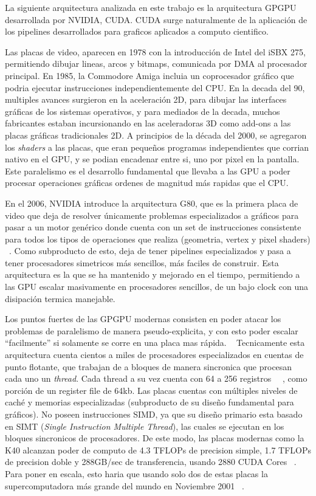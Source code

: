 La siguiente arquitectura analizada en este trabajo es la arquitectura GPGPU desarrollada por NVIDIA, CUDA.
CUDA surge naturalmente de la aplicaci\'on de los pipelines desarrollados para
graficos aplicados a computo cientifico.

Las placas de video, aparecen en 1978 con la introducci\'on de Intel del iSBX 275, permitiendo dibujar lineas,
arcos y bitmaps, comunicada por DMA al procesador principal. En 1985, la Commodore Amiga incluia un coprocesador
gr\'afico que podria ejecutar instrucciones independientemente del CPU. En la decada del 90, multiples
avances surgieron en la aceleraci\'on 2D, para dibujar las interfaces gr\'aficas de los sistemas operativos,
y para mediados de la decada, muchos fabricantes estaban incursionando en las aceleradoras 3D como
add-ons a las placas gr\'aficas tradicionales 2D. A principios de la d\'ecada del 2000, se agregaron los
\textit{shaders} a las placas, que eran peque\~nos programas independientes que corrian nativo en el GPU,
y se podian encadenar entre si, uno por pixel en la pantalla. Este paralelismo es el desarrollo fundamental
que llevaba a las GPU a poder procesar operaciones gr\'aficas ordenes de magnitud m\'as rapidas que el CPU.

En el 2006, NVIDIA introduce la arquitectura G80,
que es la primera placa de video que deja de resolver \'unicamente problemas especializados a gr\'aficos
para pasar a un motor gen\'erico donde cuenta con un set de instrucciones consistente para todos los
tipos de operaciones que realiza (geometria, vertex y pixel shaders) ~\cite{cudaHandbook}. Como subproducto de esto,
deja de tener pipelines especializados y pasa a tener procesadores simetricos m\'as sencillos, m\'as
faciles de construir. Esta arquitectura es la que se ha mantenido y mejorado en el tiempo, permitiendo
a las GPU escalar masivamente en procesadores sencillos, de un bajo clock con una disipaci\'on termica
manejable.

Los puntos fuertes de las GPGPU modernas consisten en poder atacar los problemas de paralelismo
de manera pseudo-explicita, y con esto poder escalar ``facilmente'' si solamente se corre en una
placa mas r\'apida. ~\cite{} Tecnicamente esta arquitectura cuenta cientos a miles de procesadores
especializados en cuentas de punto flotante, que trabajan de a bloques de manera sincronica
 que procesan cada uno un \textit{thread}. Cada thread a su vez cuenta con
64 a 256 registros ~\cite{NvidiaFermi}~\cite{NvidiaKepler}, como porci\'on de un register file de 64kb.
Las placas cuentas con m\'ultiples niveles de cach\'e y memorias especializadas (subproducto de
su dise\~no fundamental para gr\'aficos). No poseen instrucciones SIMD, ya que su dise\~no primario
esta basado en SIMT (\textit{Single Instruction Multiple Thread}), las cuales se ejecutan en los
bloques sincronicos de procesadores. De este modo, las placas modernas como la K40 alcanzan
poder de computo de 4.3 TFLOPs de precision simple, 1.7 TFLOPs de precision doble y 288GB/sec de
transferencia, usando 2880 CUDA Cores ~\cite{NvidiaKeplerDatasheet}. Para poner en escala, esto haria
que usando solo dos de estas placas la supercomputadora m\'as grande del mundo en Noviembre
2001 ~\cite{Top500November2001}.


